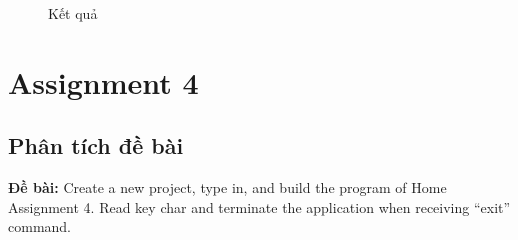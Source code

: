 \documentclass[a4paper,12pt]{article}
\begin{document}
\FloatBarrier
\begin{figure}[ht!]
	\centerline{}
	\caption{Kết quả}
	\label{fig:ass1}
\end{figure}
\clearpage
\section{Assignment 4}
\subsection{Phân tích đề bài}
\textbf{Đề bài: }Create a new project, type in, and build the program of Home Assignment 4. Read key char and terminate the application when receiving “exit” command. \\
\end{document}
